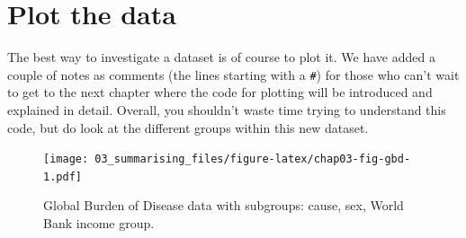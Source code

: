 \documentclass[
  12pt,
  krantz2]{krantz}
\makeatletter
\newenvironment{Shaded}{\begin{snugshade}}{\end{snugshade}}
\newcommand{\CommentTok}[1]{\textcolor[rgb]{0.56,0.35,0.01}{\textit{#1}}}
\newcommand{\DataTypeTok}[1]{\textcolor[rgb]{0.13,0.29,0.53}{#1}}
\newcommand{\DecValTok}[1]{\textcolor[rgb]{0.00,0.00,0.81}{#1}}
\newcommand{\KeywordTok}[1]{\textcolor[rgb]{0.13,0.29,0.53}{\textbf{#1}}}
\newcommand{\NormalTok}[1]{#1}
\newcommand{\OperatorTok}[1]{\textcolor[rgb]{0.81,0.36,0.00}{\textbf{#1}}}
\newcommand{\StringTok}[1]{\textcolor[rgb]{0.31,0.60,0.02}{#1}}
\newenvironment{kframe}{%
\medskip{}
\setlength{\fboxsep}{.8em}
 \def\at@end@of@kframe{}%
 \ifinner\ifhmode%
  \def\at@end@of@kframe{\end{minipage}}%
  \begin{minipage}{\columnwidth}%
 \fi\fi%
 \def\FrameCommand##1{\hskip\@totalleftmargin \hskip-\fboxsep
 \colorbox{shadecolor}{##1}\hskip-\fboxsep
     \hskip-\linewidth \hskip-\@totalleftmargin \hskip\columnwidth}%
 \MakeFramed {\advance\hsize-\width
   \@totalleftmargin\z@ \linewidth\hsize
   \@setminipage}}%
 {\par\unskip\endMakeFramed%
 \at@end@of@kframe}
\renewenvironment{Shaded}{\begin{kframe}}{\end{kframe}}
\makeatother
\begin{document}
\clearpage

\hypertarget{plot-the-data}{%
\section{Plot the data}\label{plot-the-data}}

The best way to investigate a dataset is of course to plot it.
We have added a couple of notes as comments (the lines starting with a \texttt{\#}) for those who can't wait to get to the next chapter where the code for plotting will be introduced and explained in detail.
Overall, you shouldn't waste time trying to understand this code, but do look at the different groups within this new dataset.

\begin{Shaded}
\end{Shaded}

\begin{figure}
\centering
\texttt{[image: 03\_summarising\_files/figure-latex/chap03-fig-gbd-1.pdf]}
\caption{\label{fig:chap03-fig-gbd}Global Burden of Disease data with subgroups: cause, sex, World Bank income group.}
\end{figure}
\end{document}
